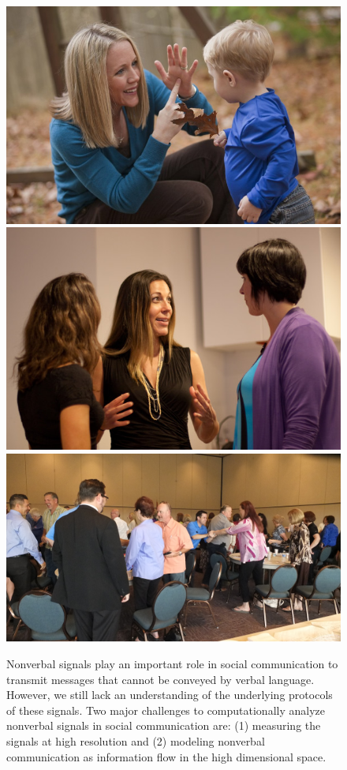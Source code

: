 \label{sec:introduction}
\begin{figure}[h]
	\centering
	\includegraphics[trim=0 0 0 0, clip=true, height=0.2\columnwidth]{figures/intro_1}
	\includegraphics[trim=0 0 0 0, clip=true, height=0.2\columnwidth]{figures/intro_5}
	\includegraphics[trim=0 0 0 0, clip=true, height=0.2\columnwidth]{figures/intro_3}
	\caption{Nonverbal signals play an important role in social communication to transmit messages that cannot be conveyed by verbal language. However, we still lack an understanding of the underlying protocols of these signals. Two major challenges to computationally analyze nonverbal signals in social communication are: (1) measuring the signals at high resolution and (2) modeling nonverbal communication as information flow in the high dimensional space.}	
	\label{fig:ch1_intro}
\end{figure}


